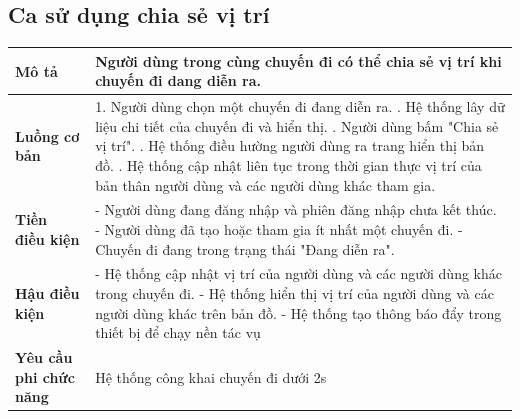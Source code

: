 \subsection{Ca sử dụng chia sẻ vị trí}
\vspace{0.5cm}


\noindent 
\begin{tabularx}{\linewidth}{| l | X |} 
\hline 
\textbf{Mô tả} & Người dùng trong cùng chuyến đi có thể chia sẻ vị trí khi chuyến đi dang diễn ra. \\
\hline 
\textbf{Luồng cơ bản} & 1. Người dùng chọn một chuyến đi đang diễn ra. \newline
                        2. Hệ thống lây dữ liệu chi tiết của chuyến đi và hiển thị. \newline
                        3. Người dùng bấm "Chia sẻ vị trí". \newline
                        4. Hệ thống điều hường người dùng ra trang hiển thị bản đồ. \newline
                        5. Hệ thống cập nhật liên tục trong thời gian thực vị trí của bản thân người dùng và các người dùng khác tham gia. \\
             
               
       
\hline 
\textbf{Tiền điều kiện} & - Người dùng đang đăng nhập và phiên đăng nhập chưa kết thúc.\newline
                        - Người dùng đã tạo hoặc tham gia ít nhất một chuyến đi. \newline
                        - Chuyến đi đang trong trạng thái "Đang diễn ra".\\


\hline 
\textbf{Hậu điều kiện} & - Hệ thống cập nhật vị trí của người dùng và các người dùng khác trong chuyến đi. \newline
- Hệ thống hiển thị vị trí của người dùng và các người dùng khác trên bản đồ. \newline
- Hệ thống tạo thông báo đẩy trong thiết bị để chạy nền tác vụ \\
                        

\hline 
\textbf{Yêu cầu phi chức năng} & Hệ thống công khai chuyến đi dưới 2s \\
\hline 
\end{tabularx}

